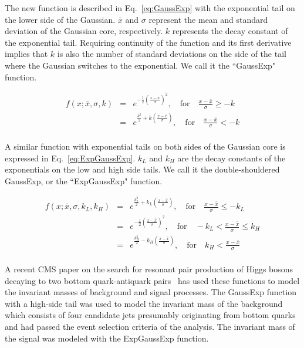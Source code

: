 \documentclass[10pt,letterpaper]{article}
\begin{document}
The new function is described in Eq.~\ref{eq:GaussExp} with the exponential tail on the lower side of the Gaussian. $\bar{x}$ and $\sigma$ represent the mean and standard deviation of the Gaussian core, respectively. $k$ represents the decay constant of the exponential tail. Requiring continuity of the function and its first derivative implies that $k$ is also the number of standard deviations on the side of the tail where the Gaussian switches to the exponential. We call it the ``GaussExp" function.

\begin{eqnarray}
\label{eq:GaussExp}
f(x; \bar{x}, \sigma, k) &=& e^{-\frac{1}{2}\left(\frac{x-\bar{x}}{\sigma}\right)^2}, \quad \textrm{for} \quad \frac{x-\bar{x}}{\sigma} \geq -k  \\
                         &=& e^{\frac{k^2}{2}+k\left(\frac{x-\bar{x}}{\sigma}\right)}, \quad \textrm{for} \quad \frac{x-\bar{x}}{\sigma} < -k \nonumber
\end{eqnarray} \\

A similar function with exponential tails on both sides of the Gaussian core is expressed in Eq.~\ref{eq:ExpGaussExp}. $k_L$ and $k_H$ are the decay constants of the exponentials on the low and high side tails. We call it the double-shouldered GaussExp, or the ``ExpGaussExp" function.

\begin{eqnarray}
\label{eq:ExpGaussExp}
f(x; \bar{x}, \sigma, k_L, k_H) &=& e^{\frac{k_L^2}{2}+k_L\left(\frac{x-\bar{x}}{\sigma}\right)}, \quad \textrm{for} \quad \frac{x-\bar{x}}{\sigma} \leq -k_L \\
                         &=& e^{-\frac{1}{2}\left(\frac{x-\bar{x}}{\sigma}\right)^2}, \quad \textrm{for} \quad -k_L < \frac{x-\bar{x}}{\sigma} \leq k_H  \nonumber \\
                         &=& e^{\frac{k_H^2}{2}-k_H\left(\frac{x-\bar{x}}{\sigma}\right)}, \quad \textrm{for} \quad k_H < \frac{x-\bar{x}}{\sigma} \nonumber
\end{eqnarray} \\

A recent CMS paper on the search for resonant pair production of Higgs bosons decaying to two bottom quark-antiquark pairs~\cite{Khachatryan2015560} has used these functions to model the invariant masses of background and signal processes. The GaussExp function with a high-side tail was used to model the invariant mass of the background which consists of four candidate jets presumably originating from bottom quarks and had passed the event selection criteria of the analysis. The invariant mass of the signal was modeled with the ExpGaussExp function.
\end{document}
